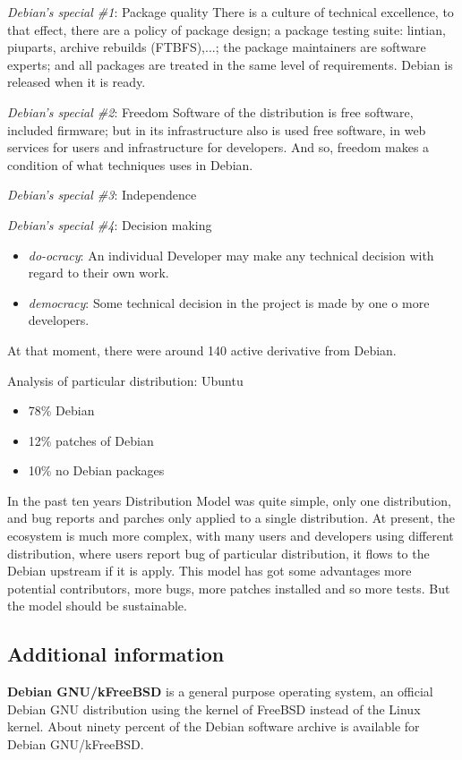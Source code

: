 \documentclass[11pt]{article}
\begin{document}
	\emph{Debian's special \#1}: Package quality
		There is a culture of technical excellence, to that effect, there are a policy of package design; a package testing suite: lintian, piuparts, archive rebuilds (FTBFS),...; the package maintainers are software experts; and all packages are treated in the same level of requirements.
	Debian is released when it is ready.

	\emph{Debian's special \#2}: Freedom
	Software of the distribution is free software, included firmware; but in its infrastructure also is used free software, in web services for users and infrastructure for developers. And so, freedom makes a condition of what techniques uses in Debian.

	\emph{Debian's special \#3}: Independence

	\emph{Debian's special \#4}: Decision making
	\begin{itemize}
			\item \emph{do-ocracy}: An individual Developer may make any technical decision with regard to their own work.
			\item \emph{democracy}: Some technical decision in the project is made by one o more developers.
	\end{itemize}

At that moment, there were around 140 active derivative from Debian.
		
Analysis of particular distribution: Ubuntu
\begin{itemize}
	\item 78\% Debian
	\item 12\% patches of Debian
	\item 10\% no Debian packages
\end{itemize}
	
In the past ten years Distribution Model was quite simple, only one distribution, and bug reports and parches only applied to a single distribution. At present, the ecosystem is much more complex, with many users and developers using different distribution, where users report bug of particular distribution, it flows to the Debian upstream if it is apply. This model has got some advantages more potential contributors, more bugs, more patches installed and so more tests. But the model should be sustainable.

\subsection{Additional information}
\textbf{Debian GNU/kFreeBSD} is a general purpose operating system, an official Debian GNU distribution using the kernel of FreeBSD instead of the Linux kernel. About ninety percent of the Debian software archive is available for Debian GNU/kFreeBSD.
\end{document}
